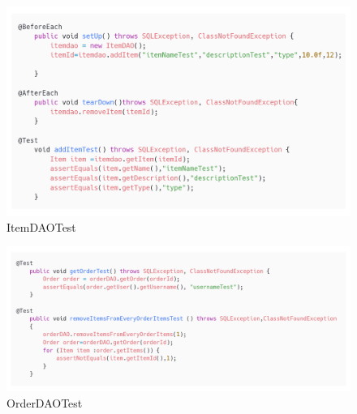 \documentclass{article}
\begin{document}
\begin{figure}[H]
    \centering
    \includegraphics[width=1.0\linewidth]{imgs/snippets/Code_ItemDAOTest.png}
    \caption{ItemDAOTest}
    \label{ItemDAOTest}
\end{figure}

\begin{figure}[H]
    \centering
    \includegraphics[width=1.0\linewidth]{imgs/snippets/Code_OrderDAOTest.png}
    \caption{OrderDAOTest}
    \label{OrderDAOTest}
\end{figure}
\end{document}
